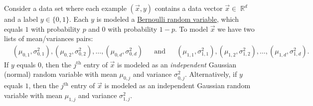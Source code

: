 \documentclass[10pt]{article}
\DeclareMathOperator{\R}{\mathbb{R}}
\begin{document}
Consider a data set where each example $(\vec{x},y)$ contains a data vector $\vec{x}\in \R^d$ and a label $y\in \{0,1\}$. Each $y$ is modeled a \href{https://en.wikipedia.org/wiki/Bernoulli_distribution}{Bernoulli random variable}, which equals $1$ with probability $p$ and $0$ with probability $1-p$. To model $\vec{x}$ we have two lists of mean/variances pairs: 
\begin{align*}
&(\mu_{0,1}, \sigma_{0,1}^2), (\mu_{0,2}, \sigma_{0,2}^2), \ldots, (\mu_{0,d}, \sigma_{0,d}^2)& &\text{and}& &(\mu_{1,1}, \sigma_{1,1}^2), (\mu_{1,2}, \sigma_{1,2}^2), \ldots, (\mu_{1,d}, \sigma_{1,d}^2).
\end{align*} 
If $y$ equals $0$, then the $j^\text{th}$ entry of $\vec{x}$ is modeled as an \emph{independent} Gaussian (normal) random variable with mean $\mu_{0,j}$ and variance $\sigma_{0,j}^2$. Alternatively, if $y$ equals $1$, then the $j^\text{th}$ entry of $\vec{x}$ is modeled as an {independent}  Gaussian random variable with mean $\mu_{1,j}$ and variance $\sigma_{1,j}^2$.
\end{document}
